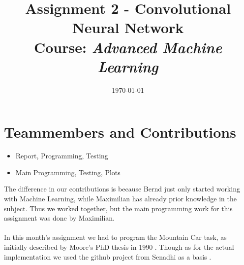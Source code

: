 \documentclass{article}
\title{Assignment 2 - Convolutional Neural Network\\
		{\large Course: \textit{Advanced Machine Learning}}}
\date{\today}
\begin{document}
	
	\maketitle
	
	\section{Teammembers and Contributions}
	\label{sec:TeammembersAndContributions}
	
	\begin{itemize}
		\item {} Report, Programming, Testing
		\item {} Main Programming, Testing, Plots
	\end{itemize}
	
	\noindent The difference in our contributions is because Bernd just only started working with Machine Learning, while Maximilian has already prior knowledge in the subject. Thus we worked together, but the main programming work for this assignment was done by Maximilian. \\
	\\
	In this month's assignment we had to program the Mountain Car task, as initially described by Moore's PhD thesis in 1990 \cite{Moore90efficientmemory-based}. Though as for the actual implementation we used the github project from Senadhi as a basis \cite{MountainCar-v02018}. 
	
	
\end{document}
